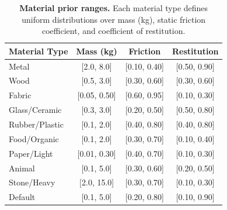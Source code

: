 \begin{table}[h]
\centering
\caption{\textbf{Material prior ranges.} Each material type defines uniform distributions over mass (kg), static friction coefficient, and coefficient of restitution.}
\label{tab:material_priors}
\small
\begin{tabular}{@{}lccc@{}}
\toprule
\textbf{Material Type} & \textbf{Mass (kg)} & \textbf{Friction} & \textbf{Restitution} \\
\midrule
Metal        & [2.0, 8.0]    & [0.10, 0.40] & [0.50, 0.90] \\
Wood         & [0.5, 3.0]    & [0.30, 0.60] & [0.30, 0.60] \\
Fabric       & [0.05, 0.50]  & [0.60, 0.95] & [0.10, 0.30] \\
Glass/Ceramic& [0.3, 3.0]    & [0.20, 0.50] & [0.50, 0.80] \\
Rubber/Plastic& [0.1, 2.0]   & [0.40, 0.80] & [0.40, 0.80] \\
Food/Organic & [0.1, 2.0]    & [0.30, 0.70] & [0.10, 0.40] \\
Paper/Light  & [0.01, 0.30]  & [0.40, 0.70] & [0.10, 0.30] \\
Animal       & [0.1, 5.0]    & [0.30, 0.60] & [0.20, 0.50] \\
Stone/Heavy  & [2.0, 15.0]   & [0.30, 0.70] & [0.10, 0.30] \\
Default      & [0.1, 5.0]    & [0.20, 0.80] & [0.10, 0.90] \\
\bottomrule
\end{tabular}
\end{table}


